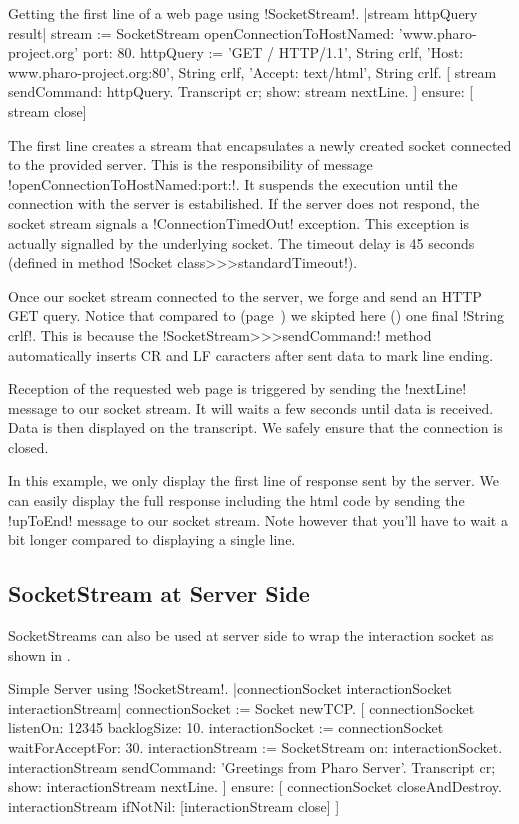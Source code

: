 \documentclass[a4paper,10pt,twoside]{book}
\begin{document}
\begin{script}{Getting the first line of a web page using \ct!SocketStream!.}
	|stream httpQuery result|
	stream := SocketStream openConnectionToHostNamed: 'www.pharo-project.org' port: 80.
	httpQuery := 'GET / HTTP/1.1', String crlf, 
		'Host: www.pharo-project.org:80', String crlf, 
		'Accept: text/html', String crlf.
	[
		stream sendCommand: httpQuery.
		Transcript cr; show: stream nextLine.
	] ensure: [
		stream close]
\end{script}

The first line creates a stream that encapsulates a newly created socket connected to the provided server.
This is the responsibility of message \ct!openConnectionToHostNamed:port:!.
It suspends the execution until the connection with the server is estabilished.
If the server does not respond, the socket stream signals a \ct!ConnectionTimedOut! exception.
This exception is actually signalled by the underlying socket.
The timeout delay is 45 seconds (defined in method \ct!Socket class>>>standardTimeout!).

Once our socket stream connected to the server, we forge and send an HTTP GET query.
Notice that compared to  (page~\pageref{scr:script:closeAndDestroy}) we skipted here () one final \ct!String crlf!.
This is because the \ct!SocketStream>>>sendCommand:! method automatically inserts CR and LF caracters after sent data to mark line ending.

Reception of the requested web page is triggered by sending the \ct!nextLine! message to our socket stream.
It will waits a few seconds until data is received.
Data is then displayed on the transcript.
We safely ensure that the connection is closed.

In this example, we only display the first line of response sent by the server.
We can easily display the full response including the html code by sending the \ct!upToEnd! message to our socket stream.
Note however that you'll have to wait a bit longer compared to displaying a single line.

\subsection{SocketStream at Server Side}
SocketStreams can also be used at server side to wrap the interaction socket as shown in .

\begin{script}{Simple Server using \ct!SocketStream!.}
|connectionSocket interactionSocket interactionStream|
connectionSocket := Socket newTCP. 
[
	connectionSocket listenOn: 12345 backlogSize: 10. 
	interactionSocket := connectionSocket waitForAcceptFor: 30. 
	interactionStream := SocketStream on: interactionSocket.
	interactionStream sendCommand: 'Greetings from Pharo Server'.
	Transcript cr; show: interactionStream nextLine.
] ensure: [
	connectionSocket closeAndDestroy.
	interactionStream ifNotNil: [interactionStream close]
]
\end{script}
\end{document}
